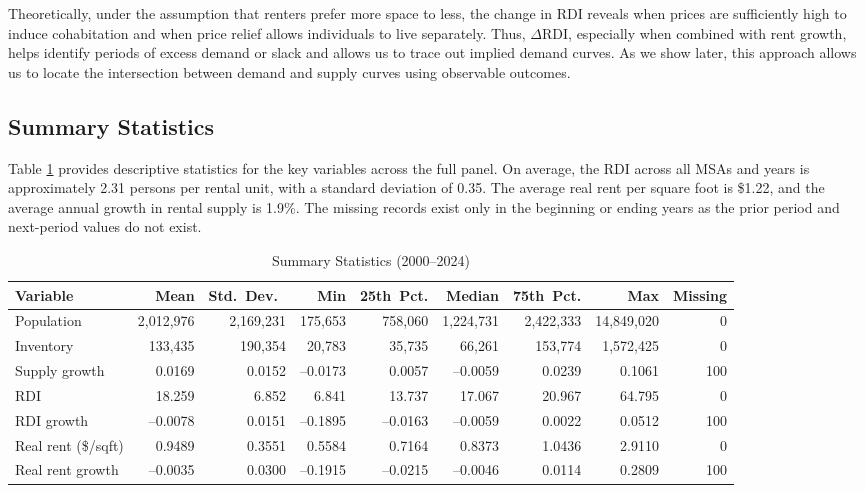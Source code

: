 \documentclass[APA,Times1COL]{WileyNJDv5} %
\begin{document}
Theoretically, under the assumption that renters prefer more space to less, the change in RDI reveals when prices are sufficiently high to induce cohabitation and when price relief allows individuals to live separately. Thus, \( \Delta \text{RDI} \), especially when combined with rent growth, helps identify periods of excess demand or slack and allows us to trace out implied demand curves. As we show later, this approach allows us to locate the intersection between demand and supply curves using observable outcomes.


\subsection{Summary Statistics}
Table \ref{tab:summary_stats} provides descriptive statistics for the key variables across the full panel. On average, the RDI across all MSAs and years is approximately 2.31 persons per rental unit, with a standard deviation of 0.35. The average real rent per square foot is \$1.22, and the average annual growth in rental supply is 1.9\%. The missing records exist only in the beginning or ending years as the prior period and next-period values do not exist. 

\begin{table}[hbt!]
	\centering
	\caption{Summary Statistics (2000--2024)}\label{tab:summary_stats}
	\begin{tabular}{lrrrrrrrr}
	\toprule
	Variable & Mean       & Std.\ Dev.\   & Min       & 25th Pct.  & Median     & 75th Pct.  & Max        & Missing \\
	\midrule
	Population          & 2,012,976  & 2,169,231  &   175,653  &   758,060  & 1,224,731  & 2,422,333  & 14,849,020 &   0  \\
	Inventory           &   133,435  &   190,354  &    20,783  &    35,735  &    66,261  &   153,774  &  1,572,425 &   0  \\
	Supply growth       &      0.0169&      0.0152&     –0.0173&     0.0057 &    –0.0059 &     0.0239 &     0.1061 & 100  \\
	RDI                 &     18.259 &      6.852 &      6.841 &    13.737  &    17.067  &    20.967  &    64.795  &   0  \\
	RDI growth          &     –0.0078&      0.0151&     –0.1895&    –0.0163 &    –0.0059 &     0.0022 &     0.0512 & 100  \\
	Real rent (\$/sqft) &      0.9489&      0.3551 &      0.5584&     0.7164 &     0.8373 &     1.0436 &     2.9110 &   0  \\
	Real rent growth    &     –0.0035&      0.0300 &     –0.1915&    –0.0215 &    –0.0046 &     0.0114 &     0.2809 & 100  \\
	\bottomrule
\end{tabular}
\end{table}
\end{document}
